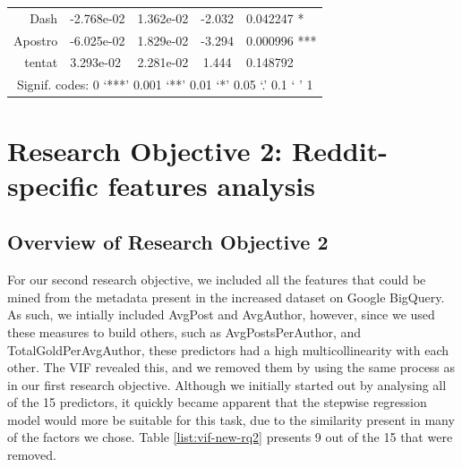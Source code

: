 \documentclass[bsc,frontabs,twoside,singlespacing,parskip,deptreport]{infthesis}
\begin{document}
\begin{table}[p]
{\begin{tabular}{rlccl}
Dash        & -2.768e-02                   & 1.362e-02  & -2.032  & 0.042247 *                          \\
Apostro     & -6.025e-02                   & 1.829e-02  & -3.294  & 0.000996 ***                        \\
tentat      & 3.293e-02                    & 2.281e-02  & 1.444   & 0.148792                            \\ \hline
\multicolumn{5}{c}{Signif. codes:  0 ‘***’ 0.001 ‘**’ 0.01 ‘*’ 0.05 ‘.’ 0.1 ‘ ’ 1}                      \\ \hline
\end{tabular}%
}
\end{table}


\chapter{Research Objective 2: Reddit-specific features analysis}\label{reddit-features-results}

\section{Overview of Research Objective 2}

For our second research objective, we included all the features that could be mined from the metadata present in the increased dataset on Google BigQuery. As such, we intially included AvgPost and AvgAuthor, however, since we used these measures to build others, such as AvgPostsPerAuthor, and TotalGoldPerAvgAuthor, these predictors had a high multicollinearity with each other. The VIF revealed this, and we removed them by using the same process as in our first research objective. Although we initially started out by analysing all of the 15 predictors, it quickly became apparent that the stepwise regression model would more be suitable for this task, due to the similarity present in many of the factors we chose. Table \ref{list:vif-new-rq2} presents 9 out of the 15 that were removed.

\begin{table}[!h]
\centering
{}
\caption{Predictors that were removed for the additional features}
\label{list:vif-new-rq2}
\end{table}
\end{document}
